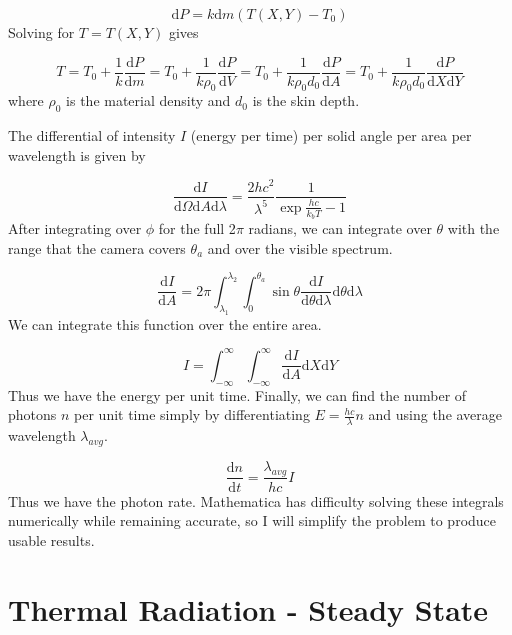 \documentclass[12pt]{article}
\begin{document}
\begin{equation}
\mathrm{d}P=k \mathrm{d}m (T(X,Y)-T_0)
\end{equation}
Solving for $T=T(X,Y)$ gives

\begin{equation}
T=T_0+\frac{1}{k} \frac{\mathrm{d}P}{\mathrm{d}m}=T_0+\frac{1}{k \rho_0} \frac{\mathrm{d}P}{\mathrm{d}V}=T_0+\frac{1}{k \rho_0 d_0} \frac{\mathrm{d}P}{\mathrm{d}A}=T_0+\frac{1}{k \rho_0 d_0} \frac{\mathrm{d}P}{\mathrm{d}X \mathrm{d}Y}
\end{equation}
where $\rho_0$ is the material density and $d_0$ is the skin depth.

The differential of intensity $I$ (energy per time) per solid angle per area per wavelength is given by

\begin{equation}
\frac{\mathrm{d}I}{\mathrm{d} \Omega \mathrm{d}A \mathrm{d} \lambda}=\frac{2hc^2}{\lambda^5} \frac{1}{\exp{\frac{hc}{k_b T}}-1}
\end{equation}
After integrating over $\phi$ for the full 2$\pi$ radians, we can integrate over $\theta$ with the range that the camera covers $\theta_a$ and over the visible spectrum.

\begin{equation}
\frac{\mathrm{d}I}{\mathrm{d}A}=2 \pi \int_{\lambda_1}^{\lambda_2} \int_0^{\theta_a} \sin \theta \frac{\mathrm{d}I}{\mathrm{d} \theta \mathrm{d} \lambda} \mathrm{d} \theta \mathrm{d} \lambda
\end{equation}
We can integrate this function over the entire area.

\begin{equation}
I=\int_{-\infty}^{\infty} \int_{-\infty}^{\infty} \frac{\mathrm{d}I}{\mathrm{d}A} \mathrm{d}X \mathrm{d}Y
\end{equation}
Thus we have the energy per unit time. Finally, we can find the number of photons $n$ per unit time simply by differentiating $E=\frac{hc}{\lambda} n$ and using the average wavelength $\lambda_{avg}$.

\begin{equation}
\frac{\mathrm{d}n}{\mathrm{d}t}=\frac{\lambda_{avg}}{hc} I
\end{equation}
Thus we have the photon rate. Mathematica has difficulty solving these integrals numerically while remaining accurate, so I will simplify the problem to produce usable results.

\section{Thermal Radiation - Steady State}
\end{document}

